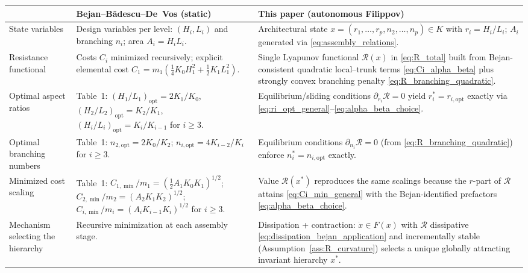 \documentclass[12pt]{article}
\theoremstyle{plain}
\theoremstyle{definition}
\theoremstyle{remark}
\newcommand{\opt}{\mathrm{opt}}
\begin{document}
\begin{table}[H]
\centering
\renewcommand{\arraystretch}{1.25}
\begin{tabular}{p{4.1cm} p{5.9cm} p{5.9cm}}
\toprule
& \textbf{Bejan--B\u{a}descu--De~Vos (static)} & \textbf{This paper (autonomous Filippov)}\\
\midrule

State variables
&
Design variables per level: $(H_i,L_i)$ and branching $n_i$; area $A_i=H_iL_i$.
&
Architectural state $x=(r_1,\dots,r_p,n_2,\dots,n_p)\in K$ with $r_i=H_i/L_i$;
$A_i$ generated via \eqref{eq:assembly_relations}. \\

Resistance functional
&
Costs $C_i$ minimized recursively; explicit elemental cost
$C_1=m_1(\tfrac14K_0H_1^2+\tfrac12K_1L_1^2)$.
&
Single Lyapunov functional $\mathcal R(x)$ in \eqref{eq:R_total}
built from Bejan-consistent quadratic local--trunk terms
\eqref{eq:Ci_alpha_beta} plus strongly convex branching penalty
\eqref{eq:R_branching_quadratic}. \\

Optimal aspect ratios
&
Table~1: $(H_1/L_1)_{\opt}=2K_1/K_0$,
$(H_2/L_2)_{\opt}=K_2/K_1$,
$(H_i/L_i)_{\opt}=K_i/K_{i-1}$ for $i\ge3$.
&
Equilibrium/sliding conditions $\partial_{r_i}\mathcal R=0$ yield
$r_i^\ast=r_{i,\opt}$ exactly via \eqref{eq:ri_opt_general}--\eqref{eq:alpha_beta_choice}. \\

Optimal branching numbers
&
Table~1: $n_{2,\opt}=2K_0/K_2$; $n_{i,\opt}=4K_{i-2}/K_i$ for $i\ge3$.
&
Equilibrium conditions $\partial_{n_i}\mathcal R=0$ (from \eqref{eq:R_branching_quadratic})
enforce $n_i^\ast=n_{i,\opt}$ exactly. \\

Minimized cost scaling
&
Table~1: $C_{1,\min}/m_1=(\tfrac12A_1K_0K_1)^{1/2}$;
$C_{2,\min}/m_2=(A_2K_1K_2)^{1/2}$;
$C_{i,\min}/m_i=(A_iK_{i-1}K_i)^{1/2}$ for $i\ge3$.
&
Value $\mathcal R(x^\ast)$ reproduces the same scalings because the $r$-part
of $\mathcal R$ attains \eqref{eq:Ci_min_general} with the Bejan-identified
prefactors \eqref{eq:alpha_beta_choice}. \\

Mechanism selecting the hierarchy
&
Recursive minimization at each assembly stage.
&
Dissipation + contraction:
$\dot x\in F(x)$ with $\mathcal R$ dissipative \eqref{eq:dissipation_bejan_application}
and incrementally stable (Assumption~\ref{ass:R_curvature}) selects a unique
globally attracting invariant hierarchy $x^\ast$. \\


\end{tabular}
\end{table}
\end{document}
